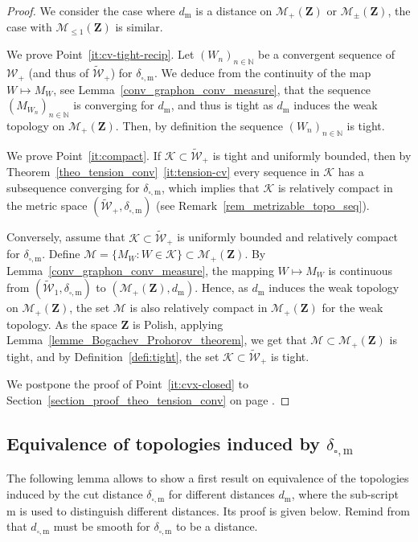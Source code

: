 \documentclass{amsart}
\theoremstyle{plain}
\theoremstyle{definition}
\newcommand{\Space}{\mathbf{Z}}
\newcommand{\ck}{\mathcal{K}}
\newcommand{\cm}{\mathcal{M}}
\newcommand{\SubProba}{\mathcal{M}_{\leq1}(\Space)}
\newcommand{\Meas}{\mathcal{M}_+(\Space)}
\newcommand{\SignedMeas}{\mathcal{M}_{\pm}(\Space)}
\newcommand{\Kernelp}{\mathcal{W}_{+}}
\newcommand{\UGraphon}{\widetilde{\mathcal{W}}_1}
\newcommand{\UKernelp}{\widetilde{\mathcal{W}}_{+}}
\newcommand{\m}{\mathrm{m}}
\newcommand{\dmeas}{d_\m}
\newcommand{\dcut}{d_{\square,\m}}
\newcommand{\ddcut}{\delta_{\square,\m}}
\newcommand{\N}{\mathbb{N}}
\begin{document}
\begin{proof}
   We consider the case where $\dmeas$ is a distance on $\Meas$ or $\SignedMeas$,
   	the case with $\SubProba$ is similar.

  We prove  Point~\ref{it:cv-tight-recip}. Let  $(W_n )_{n\in\N}$  be a
  convergent  sequence  of  $\Kernelp$  (and thus  of  $\UKernelp$)  for
  $\ddcut$. We  deduce from the continuity  of the map $W  \mapsto M_W$,
  see    Lemma~\ref{conv_graphon_conv_measure},   that    the   sequence
  $(M_{W_n} )_{n\in\N}$ is converging for $\dmeas$, and thus is tight
  as $\dmeas$ induces the weak  topology on $\Meas$. Then, by definition
  the sequence $(W_n )_{n\in\N}$ is tight.


 
  \medskip

  We prove  Point~\ref{it:compact}.  If $\ck\subset \UKernelp$  is tight
  and           uniformly           bounded,           then           by
  Theorem~\ref{theo_tension_conv}~\ref{it:tension-cv}
  every sequence in $\ck$ has a subsequence converging for $\ddcut$,
  which implies that $\ck$ is relatively compact in the metric space
  	$(\UKernelp,\ddcut)$ (see Remark~\ref{rem_metrizable_topo_seq}).

  Conversely, assume  that $\ck\subset  \UKernelp$ is  uniformly bounded
  and      relatively      compact       for      $\ddcut$.       Define
  $\cm  =   \{  M_W  :  W   \in  \mathcal{K}  \}  \subset   \Meas$.   By
  Lemma~\ref{conv_graphon_conv_measure}, the mapping  $W \mapsto M_W$ is
  continuous from $(\UGraphon, \ddcut)$ to $(\Meas, \dmeas)$.  Hence, as
  $\dmeas$ induces the weak topology on $\Meas$,  the set $\cm$ is also relatively
  compact in  $\Meas$ for the weak  topology.  As the space  $\Space$ is
  Polish,  applying Lemma~\ref{lemme_Bogachev_Prohorov_theorem},  
  we  get  that  $\cm \subset \Meas$  is  tight,  and  by
  Definition~\ref{defi:tight}, the set $\ck \subset \UKernelp$ is tight.

\medskip
We postpone the proof of Point~\ref{it:cvx-closed}
	to Section~\ref{section_proof_theo_tension_conv} on page \pageref{page_proof_point_iii}.
\end{proof}


\subsection{Equivalence of topologies induced by \texorpdfstring{$\ddcut$}{}}
	\label{subsec:equiv_topo}
The following lemma allows to show a first result
on equivalence of the topologies induced by the cut distance $\ddcut$
for different distances $\dmeas$, where the sub-script $\mathrm{m}$ is used to
distinguish different distances.  
Its proof is given below.
Remind from  that $\dcut$ must be smooth for $\ddcut$ to be a distance.
\end{document}
